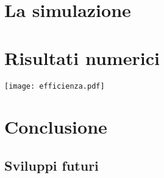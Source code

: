 \documentclass[a4paper]{memoir}
\begin{document}
\chapter{La simulazione}
\cite{Razavi11}
\cleardoublepage{}
\chapter{Risultati numerici}
\texttt{[image: efficienza.pdf]}
\cleardoublepage{}
\chapter{Conclusione}

\section{Sviluppi futuri}



\end{document}
